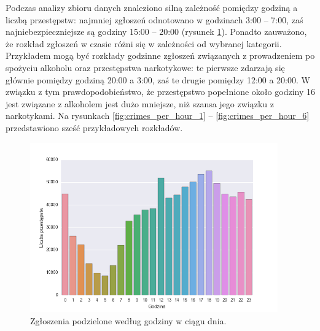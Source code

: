 \documentclass[11pt]{article} %
\begin{document}
Podczas analizy zbioru danych znaleziono silną zależność pomiędzy godziną a liczbą przestępstw: najmniej zgłoszeń odnotowano w godzinach 3:00 -- 7:00, zaś najniebezpieczniejsze są godziny 15:00 -- 20:00 (rysunek \ref{fig:hours}). Ponadto zauważono, że rozkład zgłoszeń w czasie różni się w zależności od wybranej kategorii. Przykładem mogą być rozkłady godzinne zgłoszeń związanych z prowadzeniem po spożyciu alkoholu oraz przestępstwa narkotykowe: te pierwsze zdarzają się głównie pomiędzy godziną 20:00 a 3:00, zaś te drugie pomiędzy 12:00 a 20:00. W związku z tym prawdopodobieństwo, że przestępstwo popełnione około godziny 16 jest związane z alkoholem jest dużo mniejsze, niż szansa jego związku z narkotykami. Na rysunkach \ref{fig:crimes_per_hour_1} -- \ref{fig:crimes_per_hour_6} przedstawiono sześć przykładowych rozkładów. 

\begin{figure}[!h]
  \centering
    \includegraphics[width=0.95\textwidth]{images/hours}
  \caption{Zgłoszenia podzielone według godziny w ciągu dnia.} \label{fig:hours}
\end{figure}
\end{document}
